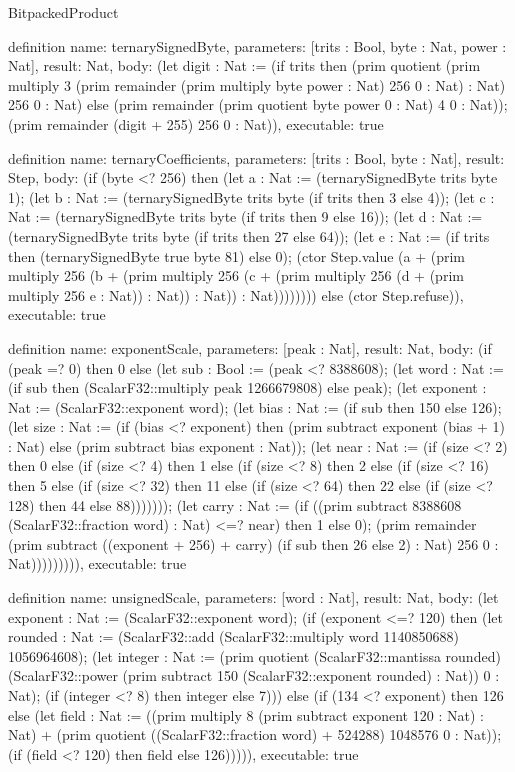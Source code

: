 \begin{lexlean}{BitpackedProduct}
\begin{semanticmodule}
definition{
  name: ternarySignedByte,
  parameters: [trits : Bool, byte : Nat, power : Nat],
  result: Nat,
  body: (let digit : Nat := (if trits then (prim quotient (prim multiply 3 (prim remainder (prim multiply byte power : Nat) 256 0 : Nat) : Nat) 256 0 : Nat) else (prim remainder (prim quotient byte power 0 : Nat) 4 0 : Nat)); (prim remainder (digit + 255) 256 0 : Nat)),
  executable: true
}

definition{
  name: ternaryCoefficients,
  parameters: [trits : Bool, byte : Nat],
  result: Step,
  body: (if (byte <? 256) then (let a : Nat := (ternarySignedByte trits byte 1); (let b : Nat := (ternarySignedByte trits byte (if trits then 3 else 4)); (let c : Nat := (ternarySignedByte trits byte (if trits then 9 else 16)); (let d : Nat := (ternarySignedByte trits byte (if trits then 27 else 64)); (let e : Nat := (if trits then (ternarySignedByte true byte 81) else 0); (ctor Step.value (a + (prim multiply 256 (b + (prim multiply 256 (c + (prim multiply 256 (d + (prim multiply 256 e : Nat)) : Nat)) : Nat)) : Nat)))))))) else (ctor Step.refuse)),
  executable: true
}

definition{
  name: exponentScale,
  parameters: [peak : Nat],
  result: Nat,
  body: (if (peak =? 0) then 0 else (let sub : Bool := (peak <? 8388608); (let word : Nat := (if sub then (ScalarF32::multiply peak 1266679808) else peak); (let exponent : Nat := (ScalarF32::exponent word); (let bias : Nat := (if sub then 150 else 126); (let size : Nat := (if (bias <? exponent) then (prim subtract exponent (bias + 1) : Nat) else (prim subtract bias exponent : Nat)); (let near : Nat := (if (size <? 2) then 0 else (if (size <? 4) then 1 else (if (size <? 8) then 2 else (if (size <? 16) then 5 else (if (size <? 32) then 11 else (if (size <? 64) then 22 else (if (size <? 128) then 44 else 88))))))); (let carry : Nat := (if ((prim subtract 8388608 (ScalarF32::fraction word) : Nat) <=? near) then 1 else 0); (prim remainder (prim subtract ((exponent + 256) + carry) (if sub then 26 else 2) : Nat) 256 0 : Nat))))))))),
  executable: true
}

definition{
  name: unsignedScale,
  parameters: [word : Nat],
  result: Nat,
  body: (let exponent : Nat := (ScalarF32::exponent word); (if (exponent <=? 120) then (let rounded : Nat := (ScalarF32::add (ScalarF32::multiply word 1140850688) 1056964608); (let integer : Nat := (prim quotient (ScalarF32::mantissa rounded) (ScalarF32::power (prim subtract 150 (ScalarF32::exponent rounded) : Nat)) 0 : Nat); (if (integer <? 8) then integer else 7))) else (if (134 <? exponent) then 126 else (let field : Nat := ((prim multiply 8 (prim subtract exponent 120 : Nat) : Nat) + (prim quotient ((ScalarF32::fraction word) + 524288) 1048576 0 : Nat)); (if (field <? 120) then field else 126))))),
  executable: true
}


\end{semanticmodule}
\end{lexlean}
